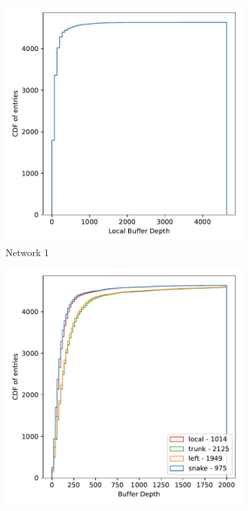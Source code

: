 \begin{figure}
  \centering
  \begin{subfigure}[b]{0.475\textwidth}
      \centering
      \includegraphics[width=\textwidth]{./images/mp60_16_slow_local_stack.pdf}
      \caption[Network2]%
      {{\small Network 1}}    
  \end{subfigure}
  \hfill
  \begin{subfigure}[b]{0.475\textwidth}  
      \centering 
      \includegraphics[width=\textwidth]{./images/mp60_16_slow_remote_stack.pdf}

\end{subfigure}
\end{figure}
